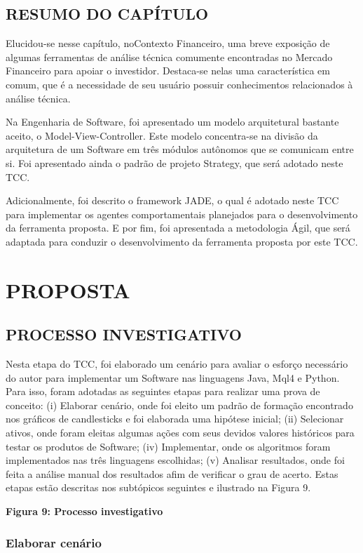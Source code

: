 \section{RESUMO DO CAPÍTULO}

Elucidou-se nesse capítulo, noContexto Financeiro, uma breve exposição de algumas ferramentas de análise técnica comumente encontradas no Mercado Financeiro para apoiar o investidor. Destaca-se nelas uma característica em comum, que é a necessidade de seu usuário possuir conhecimentos relacionados à análise técnica. 

Na Engenharia de Software, foi apresentado um modelo arquitetural bastante aceito, o Model-View-Controller. Este modelo concentra-se na divisão da arquitetura de um Software em três módulos autônomos que se comunicam entre si. Foi apresentado ainda o padrão de projeto Strategy, que será adotado neste TCC. 

Adicionalmente, foi descrito o framework JADE, o qual é adotado neste TCC para implementar os agentes comportamentais planejados para o desenvolvimento da ferramenta proposta. E por fim, foi apresentada a metodologia Ágil, que será adaptada para conduzir o desenvolvimento da ferramenta proposta por este TCC.

\newpage
\chapter[PROPOSTA]{PROPOSTA}
\section{PROCESSO INVESTIGATIVO}
Nesta etapa do TCC, foi elaborado um cenário para avaliar o esforço necessário do autor para implementar um Software nas linguagens Java, Mql4 e Python. Para isso, foram adotadas as seguintes etapas para realizar uma prova de conceito: (i) Elaborar cenário, onde foi eleito um padrão de formação encontrado nos gráficos de candlesticks e foi elaborada uma hipótese inicial; (ii) Selecionar  ativos, onde foram eleitas algumas ações com seus devidos valores históricos para testar os produtos de  Software; (iv) Implementar, onde os algoritmos foram implementados nas três linguagens escolhidas; (v) Analisar resultados, onde foi feita a análise manual dos resultados afim de verificar o grau de acerto. Estas etapas estão descritas nos subtópicos seguintes e ilustrado na Figura 9.

\textbf{Figura 9: Processo investigativo}

\subsection{Elaborar cenário}


